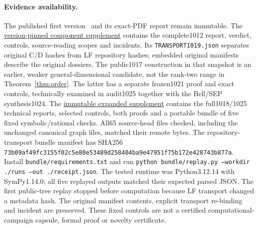 \paragraph{Evidence availability.}
The published first version~\cite{VersionOne} and its exact-PDF report remain immutable. The
\href{https://github.com/lluiseriksson/physmath-knowledge-tree/tree/f4c3e3f66afcac612ee33ee650857584e046a213/integrations/research-radar/evidence/2026-10-27-pauli-components}{version-pinned component supplement}
contains the complete1012 report, verdict, controls, source-reading scopes and incidents. Its \texttt{TRANSPORT1019.json} separates original C/D hashes from LF repository hashes; embedded original manifests describe the original dossiers. The public1017 construction in that snapshot is an earlier, weaker general-dimensional candidate, not the rank-two range in Theorem~\ref{thm:order}. The latter has a separate frozen1021 proof and exact controls, technically examined in audit1025 together with the Bell/SEP synthesis1024. The
\href{https://github.com/lluiseriksson/physmath-knowledge-tree/tree/ce7f93cbdf6f28ea7342d7d63cb50c5755fe26fc/integrations/research-radar/evidence/2026-10-27-contraction-supplement}{immutable expanded supplement}
contains the full1018/1025 technical reports, selected controls, both proofs and a portable bundle of five fixed symbolic/rational checks. All65 source-head files checked, including the unchanged canonical graph files, matched their remote bytes. The repository-transport bundle manifest has SHA256
\texttt{73b09af49fc3155f02c5e80e53489d258404ba9e47951f75b172e428743b877a}.
Install \texttt{bundle/requirements.txt} and run \texttt{python bundle/replay.py --workdir ./runs --out ./receipt.json}. The tested runtime was Python3.12.14 with SymPy1.14.0; all five replayed outputs matched their expected parsed JSON. The first public-tree replay stopped before computation because LF transport changed a metadata hash. The original manifest contents, explicit transport re-binding and incident are preserved. These fixed controls are not a certified computational-campaign capsule, formal proof or novelty certificate.

